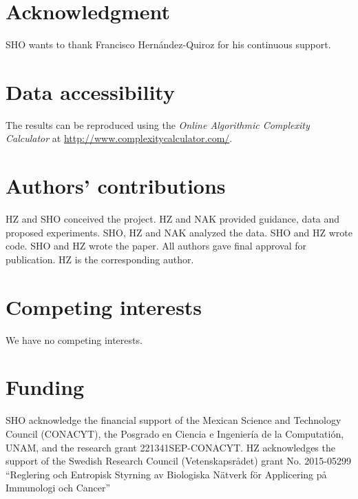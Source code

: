 \documentclass[10pt]{article}
\begin{document}
\section*{Acknowledgment}


SHO wants to thank Francisco Hern\'andez-Quiroz for his continuous support.

%
%

\section*{Data accessibility}

The results can be reproduced using the \textit{Online Algorithmic Complexity Calculator} at \url{http://www.complexitycalculator.com/}.

\section*{Authors' contributions}

HZ and SHO conceived the project. HZ and NAK provided guidance, data and proposed experiments. SHO, HZ and NAK analyzed the data. SHO and HZ wrote code. SHO and HZ wrote the paper. All authors gave final approval for publication. HZ is the corresponding author.

\section*{Competing interests}

We have no competing interests.

\section*{Funding}

SHO acknowledge the financial support of the Mexican Science and Technology Council (CONACYT), the Posgrado en Ciencia e Ingenier\'ia de la Computati\'on, UNAM, and the research grant 221341SEP-CONACYT. HZ acknowledges the support of the Swedish Research Council (Vetenskapsr{\aa}det) grant No. 2015-05299 ``Reglering och Entropisk Styrning av Biologiska N\"atverk för Applicering p{\aa} Immunologi och Cancer''
\end{document}
